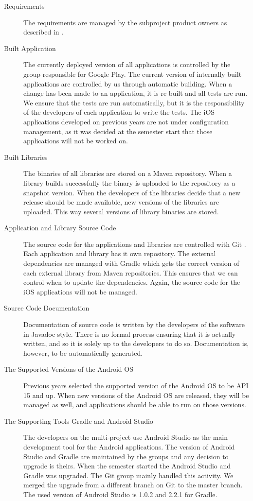 \begin{description}
  \item[Requirements] The requirements are managed by the subproject product owners as described in .
  \item[Built Application] The currently deployed version of all applications is controlled by the group responsible for Google Play. The current version of internally built applications are controlled by us through automatic building. When a change has been made to an application, it is re-built and all tests are run. We ensure that the tests are run automatically, but it is the responsibility of the developers of each application to write the tests. The iOS applications developed on previous years are not under configuration management, as it was decided at the semester start that those applications will not be worked on.
  \item[Built Libraries] The binaries of all libraries are stored on a Maven repository. When a library builds successfully the binary is uploaded to the repository as a snapshot version. When the developers of the libraries decide that a new release should be made available, new versions of the libraries are uploaded. This way several versions of library binaries are stored.
  \item[Application and Library Source Code] The source code for the applications and libraries are controlled with Git \parencite{gitwebsite}. Each application and library has it own repository. The external dependencies are managed with Gradle which gets the correct version of each external library from Maven repositories. This ensures that we can control when to update the dependencies. Again, the source code for the iOS applications will not be managed.
  \item[Source Code Documentation] Documentation of source code is written by the developers of the software in Javadoc style. There is no formal process ensuring that it is actually written, and so it is solely up to the developers to do so. Documentation is, however, to be automatically generated.
  \item[The Supported Versions of the Android OS] Previous years selected the supported version of the Android OS to be API 15 and up. When new versions of the Android OS are released, they will be managed as well, and applications should be able to run on those versions.
  \item[The Supporting Tools Gradle and Android Studio] The developers on the multi-project use Android Studio as the main development tool for the Android applications. The version of Android Studio and Gradle are maintained by the \bd groups and any decision to upgrade is theirs. When the semester started the Android Studio and Gradle was upgraded. The Git group mainly handled this activity. We merged the upgrade from a different branch on Git to the master branch. The used version of Android Studio is 1.0.2 and 2.2.1 for Gradle.
\end{description}
